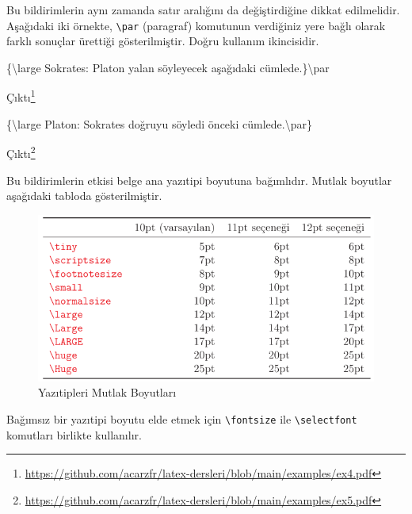 \documentclass[
  10pt,
]{scrbook}
\newenvironment{Shaded}{\begin{snugshade}}{\end{snugshade}}
\newcommand{\NormalTok}[1]{#1}
\newcommand{\SpecialCharTok}[1]{\textcolor[rgb]{0.00,0.00,0.00}{#1}}
\renewcommand{\href}[2]{#2\footnote{\url{#1}}}
\begin{document}
Bu bildirimlerin aynı zamanda satır aralığını da değiştirdiğine dikkat
edilmelidir. Aşağıdaki iki örnekte, \texttt{\textbackslash{}par} (paragraf) komutunun
verdiğiniz yere bağlı olarak farklı sonuçlar ürettiği gösterilmiştir.
Doğru kullanım ikincisidir.

\begin{Shaded}
\begin{Highlighting}[]
\NormalTok{\{\textbackslash{}large }
\NormalTok{Sokrates}\SpecialCharTok{:}\NormalTok{ Platon}
\NormalTok{yalan söyleyecek}
\NormalTok{aşağıdaki cümlede.\}\textbackslash{}par}
\end{Highlighting}
\end{Shaded}

\href{https://github.com/acarzfr/latex-dersleri/blob/main/examples/ex4.pdf}{Çıktı}

\begin{Shaded}
\begin{Highlighting}[]
\NormalTok{\{\textbackslash{}large Platon}\SpecialCharTok{:}\NormalTok{ Sokrates}
\NormalTok{doğruyu söyledi}
\NormalTok{önceki cümlede.\textbackslash{}par\}}
\end{Highlighting}
\end{Shaded}

\href{https://github.com/acarzfr/latex-dersleri/blob/main/examples/ex5.pdf}{Çıktı}

Bu bildirimlerin etkisi belge ana yazıtipi boyutuna bağımlıdır. Mutlak
boyutlar aşağıdaki tabloda gösterilmiştir.

\begin{figure}
\centering
\includegraphics{images/yazitipi9.png}
\caption{Yazıtipleri Mutlak
Boyutları}
\end{figure}

Bağımsız bir yazıtipi boyutu elde etmek için \texttt{\textbackslash{}fontsize} ile
\texttt{\textbackslash{}selectfont} komutları birlikte kullanılır.
\end{document}
